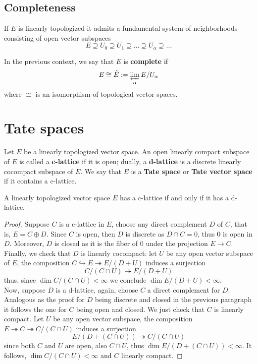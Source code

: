 \subsection*{Completeness}
If $E$ is linearly topologized it admits a fundamental system of neighborhoods consisting of open vector subspaces 
\[
	E \supseteq U_{0} \supseteq U_{1} \supseteq \ldots \supseteq U_{\alpha} \supseteq \ldots
\]
\begin{definition}\label{compleness-inverse-limit}
	In the previous context, we say that $E$ is \textbf{complete} if 
	\[
		E \cong \hat{E} := \varprojlim_{\alpha} E/U_{\alpha}
	\]
	where $\cong$ is an isomorphism of topological vector spaces.
\end{definition}
\section{Tate spaces}
\begin{definition}\label{tate-vector-space}
	Let $E$ be a linearly topologized vector space. An open linearly compact subspace of $E$ is called a \textbf{c-lattice} if it is open; dually, a \textbf{d-lattice} is a discrete linearly cocompact subspace of $E$. We say that $E$ is a \textbf{Tate space} or \textbf{Tate vector space} if it contains a c-lattice.
\end{definition}
\begin{proposition}\label{c-lattice-iff-d-lattice}
	A linearly topologized vector space $E$ has a c-lattice if and only if it has a d-lattice. 
\end{proposition}
\begin{proof}
	Suppose $C$ is a c-lattice in $E$, choose any direct complement $D$ of $C$, that is, $E = C \oplus D$. Since $C$ is open, then $D$ is discrete as $D\cap C = 0$, thus ${0}$ is open in $D$. Moreover, $D$ is closed as it is the fiber of $0$ under the projection $E \to C$. Finally, we check that $D$ is linearly cocompact: let $U$ be any open vector subspace of $E$, the composition $C \hookrightarrow E \twoheadrightarrow E/(D+U)$ induces a surjection 
	\[
		C/(C \cap U) \twoheadrightarrow E/(D+U)
	\]
	thus, since $\dim C / (C \cap U) < \infty$ we conclude $\dim E/(D+U) < \infty$. \\
	Now, suppose $D$ is a d-lattice, again, choose $C$ a direct complement for $D$. Analogous as the proof for $D$ being discrete and closed in the previous paragraph it follows the one for $C$ being open and closed. We just check that $C$ is linearly compact. Let $U$ be any open vector subspace, the composition $E \twoheadrightarrow C \twoheadrightarrow C/(C \cap U)$ induces a surjection
	 \[
	 	E/(D + (C \cap U)) \twoheadrightarrow C/(C \cap U)
	 \]
	 since both $C$ and $U$ are open, also $C\cap U$, thus $\dim E/(D + (C \cap U)) < \infty$. It follows, $\dim C/(C \cap U) < \infty$ and $C$ linearly compact.  
\end{proof}
